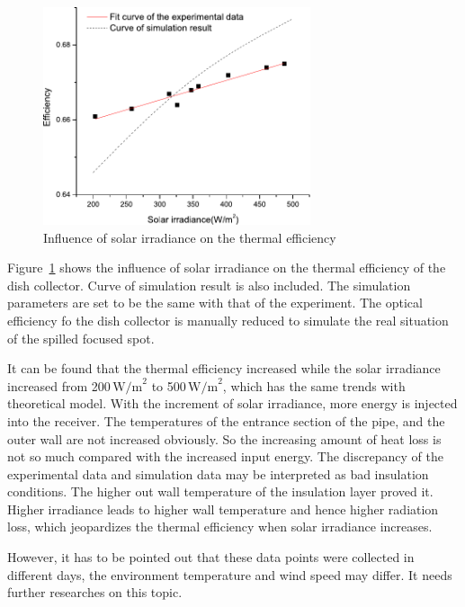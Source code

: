 \begin{figure}[!ht]
\centering
\includegraphics[width=0.7\textwidth]{fig/I_r-eta}
\caption{Influence of solar irradiance on the thermal efficiency}
\label{fig:I_r-eta}
\end{figure}
Figure~\ref{fig:I_r-eta} shows the influence of solar irradiance on the thermal efficiency of the dish collector. Curve of simulation result is also included. The simulation parameters are set to be the same with that of the experiment. The optical efficiency fo the dish collector is manually reduced to simulate the real situation of the spilled focused spot.

It can be found that the thermal efficiency increased while the solar irradiance increased from 200$\,\mathrm{W/m}^2$ to 500$\,\mathrm{W/m}^2$, which has the same trends with theoretical model. With the increment of solar irradiance, more energy is injected into the receiver. The temperatures of the entrance section of the pipe, and the outer wall are not increased obviously. So the increasing amount of heat loss is not so much compared with the increased input energy. 
The discrepancy of the experimental data and simulation data may be interpreted as bad insulation conditions. The higher out wall temperature of the insulation layer proved it. Higher irradiance leads to higher wall temperature and hence higher radiation loss, which jeopardizes the thermal efficiency when solar irradiance increases.

However, it has to be pointed out that these data points were collected in different days, the environment temperature and wind speed may differ. It needs further researches on this topic.

